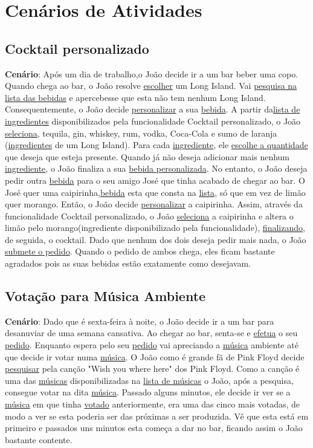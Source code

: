 \documentclass{article}
\begin{document}
\section*{Cenários de Atividades}

\subsection*{Cocktail personalizado}
\textbf{Cenário}: Após um dia de trabalho,o João decide ir a um bar beber uma copo. Quando chega ao bar, o João resolve  \underline{escolher} um Long Island. Vai \underline{pesquisa na lista das bebidas} e apercebesse que esta não tem nenhum Long Island. Consequentemente, o João decide \underline{personalizar} a sua \underline{bebida}. A partir da\underline{lista de ingredientes} disponibilizados pela funcionalidade Cocktail personalizado, o João \underline{seleciona}, tequila, gin, whiskey, rum, vodka, Coca-Cola e sumo de laranja (\underline{ingredientes} de um Long Island). Para cada \underline{ingrediente}, ele \underline{escolhe a quantidade} que deseja que esteja presente. Quando já não deseja adicionar mais nenhum \underline{ingrediente}, o João finaliza a sua \underline{bebida personalizada}. No entanto, o João deseja pedir outra \underline{bebida} para o seu amigo José que tinha acabado de chegar ao bar. O José quer uma caipirinha,\underline{bebida} esta que consta na \underline{lista}, só que em vez de limão quer morango. Então, o João decide \underline{personalizar} a caipirinha. Assim, através da funcionalidade Cocktail personalizado, o João \underline{seleciona} a caipirinha e altera o limão pelo morango(ingrediente disponibilizado pela funcionalidade), \underline{finalizando}, de seguida, o cocktail. Dado que nenhum dos dois deseja pedir mais nada, o João \underline{submete o pedido}. Quando o pedido de ambos chega, eles ficam bastante agradados pois as suas bebidas estão exatamente como desejavam.\\

\subsection*{Votação para Música Ambiente}
\textbf{Cenário}: Dado que é sexta-feira à noite, o João decide ir a um bar para desanuviar de uma semana cansativa. Ao chegar ao bar, senta-se e \underline{efetua} o seu \underline{pedido}. Enquanto espera pelo seu \underline{pedido} vai apreciando a  \underline{música} ambiente até que decide ir votar numa \underline{música}. O João como é grande fã de Pink Floyd decide \underline{pesquisar} pela canção "Wish you where here" dos Pink Floyd. Como a canção é uma das \underline{músicas} disponibilizadas na \underline{lista de músicas} o João, após a pesquisa, consegue votar na dita \underline{ música}. Passado alguns minutos, ele decide ir ver se a \underline{música} em que tinha \underline{votado} anteriormente, era uma das cinco mais votadas, de modo a ver se esta poderia ser das próximas a ser produzida. Vê que esta está em primeiro e passados uns minutos esta começa a dar no bar, ficando assim o João bastante contente.
\end{document}
